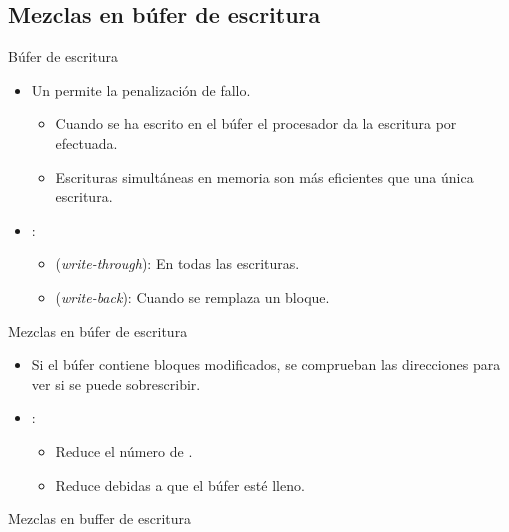\subsection{Mezclas en búfer de escritura}

\begin{frame}[t]{Búfer de escritura}
\begin{itemize}
  \item Un  permite  la penalización de fallo.
    \begin{itemize}
      \item Cuando se ha escrito en el búfer el procesador da la escritura por efectuada.
      \item Escrituras simultáneas en memoria son más eficientes que una única escritura.
    \end{itemize}

  \item {}:
    \begin{itemize}
      \item {} (\emph{write-through}): En todas las escrituras.
      \item {} (\emph{write-back}): Cuando se remplaza un bloque.
    \end{itemize}
\end{itemize}
\end{frame}

\begin{frame}[t]{Mezclas en búfer de escritura}
\begin{itemize}
  \item Si el búfer contiene bloques modificados, 
        se comprueban las direcciones para ver si se puede sobrescribir.

  \item {}:
    \begin{itemize}
      \item Reduce el número de .
      \item Reduce  debidas a que el búfer esté lleno.
    \end{itemize}
\end{itemize}
\end{frame}

\begin{frame}[t]{Mezclas en buffer de escritura}


\end{frame}
